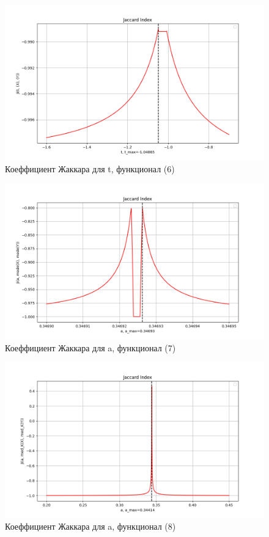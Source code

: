 \documentclass[a4paper,12pt]{article}
\begin{document}
\begin{figure}[h!]
    \centering
    \includegraphics[width=0.9\linewidth]{Jaccard-t-.png}
    \caption{Коеффициент Жаккара для t, функционал (6)}
\end{figure}

\newpage
\begin{figure}[h!]
    \centering
    \includegraphics[width=0.9\linewidth]{Jaccard-a-mode.png}
    \caption{Коеффициент Жаккара для a, функционал (7)}
\end{figure}

\begin{figure}[h!]
    \centering
    \includegraphics[width=0.9\linewidth]{Jaccard-a-med_K.png}
    \caption{Коеффициент Жаккара для a, функционал (8)}
\end{figure}
\end{document}
